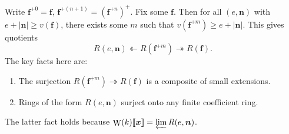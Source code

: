 \documentclass{amsart}
\DeclareMathOperator{\witt}{W}
\newcommand{\epic}{\twoheadrightarrow}
\newcommand{\pow}[1]{\llbracket #1 \rrbracket}
\begin{document}
Write $\bm f^{+0}=\bm f$, $\bm f^{+(n+1)}=(\bm f^{+n})^+$. Fix some 
$\bm f$. Then for all $(e,\bm n)$ with $e+|\bm n|\geqslant v(\bm f)$, there 
exists some $m$ such that $v(\bm f^{+m})\geqslant e+|\bm n|$. This gives quotients 
\[
  R(e,\bm n)\twoheadleftarrow R(\bm f^{+m})\epic R(\bm f) .
\]
The key facts here are:
\begin{enumerate}
  \item The surjection $R(\bm f^{+m})\epic R(\bm f)$ is a composite of small 
    extensions. 
  \item Rings of the form $R(e,\bm n)$ surject onto any finite coefficient ring. 
\end{enumerate}
The latter fact holds because $\witt(k)\pow{\bm x}=\varprojlim R(e,\bm n)$.







\end{document}
